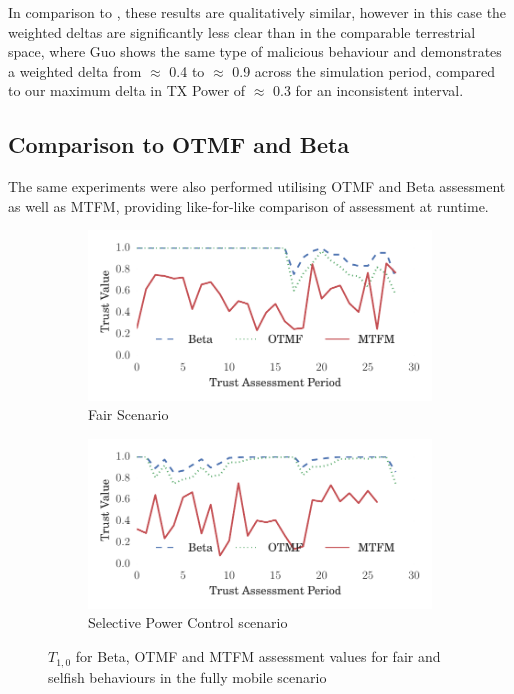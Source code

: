 \documentclass[runningheads,a4paper]{llncs}
\begin{document}
In comparison to \cite{Guo11}, these results are qualitatively similar, however in this case the weighted deltas are significantly less clear than in the comparable terrestrial space, where Guo shows the same type of malicious behaviour and demonstrates a weighted delta from $\approx$ 0.4 to $\approx$ 0.9 across the simulation period, compared to our maximum delta in TX Power of $\approx$ 0.3 for an inconsistent interval.


\subsection{Comparison to OTMF and Beta}

The same experiments were also performed utilising OTMF and Beta assessment as well as MTFM, providing like-for-like comparison of assessment at runtime.
%
\begin{figure}[h]
  \begin{subfigure}{0.5\textwidth}
    \centering
    \includegraphics[width=.95\linewidth]{img/trust_beta_otmf_fair.pdf}
    \caption{Fair Scenario}
    \label{fig:all_mobile_fair_beta}
  \end{subfigure}
  \begin{subfigure}{0.5\textwidth}
    \centering
    \includegraphics[width=.95\linewidth]{img/trust_beta_otmf_malicious.pdf}
    \caption{Selective Power Control scenario}
    \label{fig:all_mobile_badmouthing_beta}
  \end{subfigure}
\caption{$T_{1,0}$ for Beta, OTMF and MTFM assessment values for fair and selfish behaviours in the fully mobile scenario}
\label{fig:otmf_beta_comparison}
\end{figure}
\end{document}
